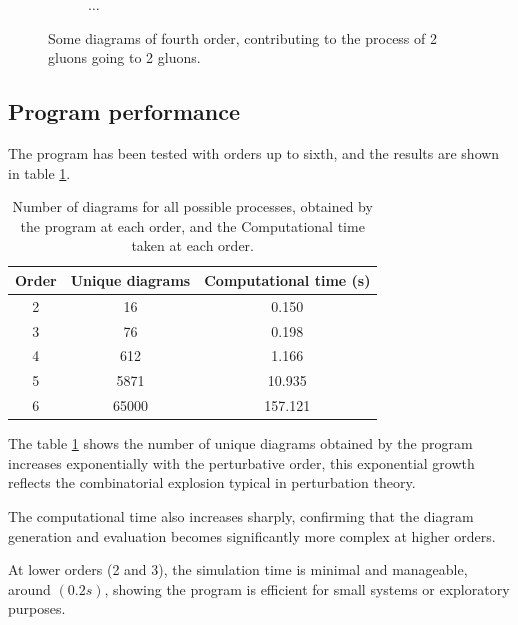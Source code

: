 \documentclass[11pt,a4paper,twoside,pdf]{article}
\numberwithin{equation}{section}
\begin{document}
\begin{figure}[h!]
\begin{subfigure}[t]{0.16\textwidth}
    \end{subfigure}
    \hfill
    \begin{subfigure}[t]{0.1\textwidth}
        \centering
        {\LARGE $\ldots$}
    \end{subfigure}
    
    \caption{Some diagrams of fourth order, contributing to the process of 
    2 gluons going to 2 gluons.}
    \label{fig:order4_2to2}
\end{figure}

\newpage


\subsection{Program performance}

 The program has been tested with orders up to sixth, and the results are shown in table 
 \ref{tab:time_diagrams}.

\begin{table} [h!]
    \centering
    \begin{tabular}{|c|c|c|}
        \hline
        Order & Unique diagrams & Computational time (s)\\
        \hline
        2  & 16 & 0.150\\
        3  & 76 & 0.198\\
        4  & 612 & 1.166\\
        5  & 5871  & 10.935\\
        6  & 65000  & 157.121\\
        \hline
    \end{tabular}
    \caption{Number of diagrams for all possible processes, obtained by the program 
    at each order, and the Computational time taken at each order.}
    \label{tab:time_diagrams}
\end{table}

The table \ref{tab:time_diagrams} shows the number of unique diagrams obtained by
the program increases exponentially with the perturbative order, this exponential growth
reflects the combinatorial explosion typical in perturbation theory.

The computational time also increases sharply, confirming that the diagram generation
and evaluation becomes significantly more complex at higher orders. 

At lower orders (2 and 3), the simulation time is minimal and manageable, around $( 0.2 s)$, 
showing the program is efficient for small systems or exploratory purposes.
\end{document}
